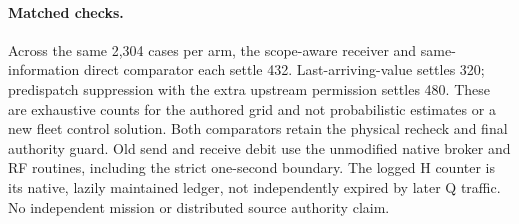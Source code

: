 \documentclass{article}
\begin{document}
\paragraph{Matched checks.}
Across the same 2,304 cases per arm, the scope-aware receiver
and same-information direct comparator each settle 432.
Last-arriving-value settles 320; predispatch suppression
with the extra upstream permission settles 480. These are
exhaustive counts for the authored grid and not probabilistic
estimates or a new fleet control solution. Both comparators
retain the physical recheck and final authority guard.
Old send and receive debit use the unmodified native broker
and RF routines, including the strict one-second boundary.
The logged H counter is its native, lazily maintained ledger,
not independently expired by later Q traffic. No independent
mission or distributed source authority claim.
\end{document}
